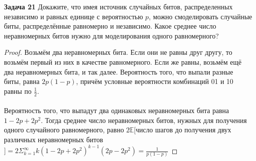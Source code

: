 \textbf{Задача 21} Докажите, что имея источник случайных битов, распределенных независимо и равных единице с вероятностью $p$, можно смоделировать случайные биты, распределённые равномерно и независимо. Какое среднее число неравномерных битов нужно для моделирования одного равномерного?

\begin{proof} Возьмём два неравномерных бита. Если они не равны друг другу, то возьмём первый из них в качестве равномерного. Если же равны, возьмём ещё два неравномерных бита, и так далее. Вероятность того, что выпали разные биты, равна $2p(1 - p)$, причём условные вероятности комбинаций 01 и 10 равны по $\frac12$. \\
\\
Вероятность того, что выпадут два одинаковых неравномерных бита равна $1-2p+2p^2$. Тогда среднее число неравномерных битов, нужных для получения одного случайного равномерного, равно $2\mathbb{E}[$число шагов до получения двух различных неравномерных битов$] = 2\Sigma_{k=1}^\infty k (1-2p+2p^2)^{k-1}(2p-2p^2) = \frac{1}{p(1-p)}$  \end{proof}